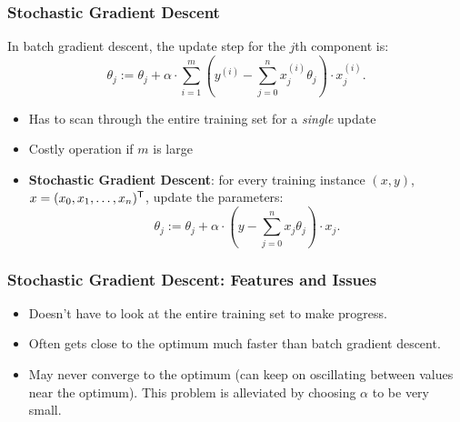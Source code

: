\documentclass[xcolor=table]{beamer}
\newcommand{\trans}[1]{\ensuremath{#1}^{\scriptsize{\textsf{T}}}}
\begin{document}
\begin{frame}[t]
\frametitle{Stochastic Gradient Descent}
In batch gradient descent, the update step for the $j$th component is:
\[
    \theta_j := \theta_j  + \alpha \cdot \sum_{i = 1}^m 
        \left ( y^{(i)} - \sum_{j = 0}^n x_j^{(i)} \theta_j \right ) \cdot x_j^{(i)}.
\]

\begin{itemize}
    \item Has to scan through the entire training set for a \emph{single} update
    
    \item Costly operation if $m$ is large
    
    \pause

    \item \textbf{Stochastic Gradient Descent}: for every training instance $(x, y)$, 
    $x = \trans{(x_0, x_1, \ldots, x_n)}$, update the parameters:
    \[
         \theta_j := \theta_j  + \alpha \cdot \left ( y - \sum_{j = 0}^n x_j 
         \theta_j \right ) \cdot x_j.
    \]
\end{itemize}
\end{frame}

\begin{frame}[t]
\frametitle{Stochastic Gradient Descent: Features and Issues}
\begin{itemize}
    \item Doesn't have to look at the entire training set to make progress.

    \item Often gets close to the optimum much faster than batch gradient descent.

    \item May never converge to the optimum (can keep on oscillating between values 
    near the optimum). This problem is alleviated by choosing $\alpha$ to be very
    small.
\end{itemize}
\end{frame}
\end{document}
